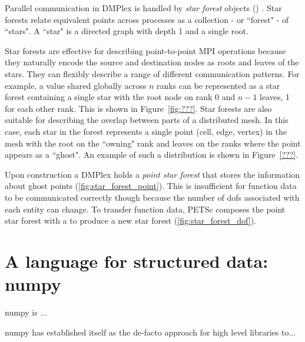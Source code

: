 \documentclass[thesis]{subfiles}
\begin{document}
Parallel communication in DMPlex is handled by \textit{star forest} objects () \parencite{zhangPetscSFScalableCommunication2021}.
Star forests relate equivalent points across processes as a collection - or ``forest" - of ``stars".
A ``star" is a directed graph with depth 1 and a single root.

Star forests are effective for describing point-to-point MPI operations because they naturally encode the source and destination nodes as roots and leaves of the stars.
They can flexibly describe a range of different communication patterns.
For example, a value shared globally across $n$ ranks can be represented as a star forest containing a single star with the root node on rank 0 and $n-1$ leaves, 1 for each other rank.
This is shown in Figure~\ref{fig:???}.
Star forests are also suitable for describing the overlap between parts of a distributed mesh.
In this case, each star in the forest represents a single point (cell, edge, vertex) in the mesh with the root on the ``owning" rank and leaves on the ranks where the point appears as a ``ghost".
An example of such a distribution is shown in Figure~\ref{???}.


Upon construction a DMPlex holds a \textit{point star forest} that stores the information about ghost points (\cref{fig:star_forest_point}).
This is insufficient for function data to be communicated correctly though because the number of \glspl{dof} associated with each entity can change.
To transfer function data, PETSc composes the point star forest with a  to produce a new star forest (\cref{fig:star_forest_dof}).



\section{A language for structured data: numpy}

numpy is ...

numpy has established itself as the de-facto approach for high level libraries to...
\end{document}

